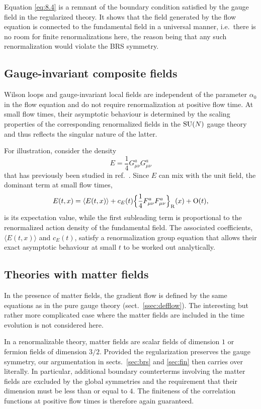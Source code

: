 Equation \eqref{eq:8.4} is a remnant of the
boundary condition satisfied by the gauge field in the regularized theory.
It shows that the field generated by the flow equation
is connected to the fundamental field in a universal manner, i.e.~there
is no room for finite renormalizations here, the reason being
that any such renormalization would violate the BRS symmetry.

\subsection{Gauge-invariant composite fields}

Wilson loops and gauge-invariant local fields are independent of
the parameter $\alpha_0$ in the flow equation
and do not require renormalization
at positive flow time. At small flow times,
their asymptotic behaviour is determined by the scaling
properties of the corresponding
renormalized fields in the $\mathrm{SU}(N)$ gauge theory and thus
reflects the singular nature of the latter.

For illustration, consider the density
\begin{equation}
   E=\frac{1}{4}G_{\mu\nu}^aG_{\mu\nu}^a
   \label{eq:8.5}
\end{equation}
that has previously been studied in ref.~\cite{WilsonFlow}.
Since $E$ can mix with the unit field, the dominant term
at small flow times,
\begin{align}
   E(t,x)=\langle E(t,x)\rangle+c_E(t)
   \Bigl\{\frac{1}{4}F^a_{\mu\nu}F^a_{\mu\nu}\Bigr\}_{\mathrm{R}}(x)+\mathrm{O}(t),
   \label{eq:8.6}
\end{align}
is its expectation value, while the first subleading term is proportional
to the renormalized action density of the fundamental field.
The associated coefficients,
$\langle E(t,x)\rangle$ and $c_E(t)$,
satisfy a renormalization
group equation that allows their exact asymptotic behaviour
at small $t$ to be worked out analytically.

\subsection{Theories with matter fields}

In the presence of matter fields, the gradient flow is
defined by the same equations
as in the pure gauge theory (sect.~\ref{ssec:defflow}).
The interesting but rather more complicated case where
the matter fields are included in the time evolution
is not considered here.

In a renormalizable theory, matter fields are
scalar fields of dimension $1$ or fermion fields of
dimension $3/2$. Provided
the regularization preserves the
gauge symmetry, our argumentation
in sects.~\ref{sec:brs} and \ref{sec:fin} then carries over literally. In particular,
additional boundary counterterms involving the matter fields
are excluded by the global symmetries and the requirement
that their dimension must be less than or equal to $4$.
The finiteness of the correlation functions
at positive flow times is therefore again guaranteed.

